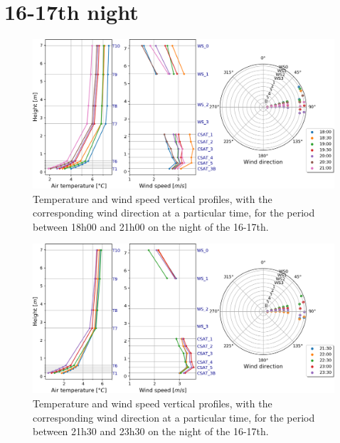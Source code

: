 \label{ch:appendix}
\section{16-17th night} 

\begin{figure}[!ht]
    \centering
    \includegraphics[width=1\textwidth]{fig/chapter_4/16-17/18-21_profiles.png}
    \caption{Temperature and wind speed vertical profiles, with the corresponding wind direction at a particular time, for the period between 18h00 and 21h00 on the night of the 16-17th.}
    \label{fig:16-17_18-21_profiles.png}
\end{figure}

\begin{figure}[!ht]
    \centering
    \includegraphics[width=1\textwidth]{fig/chapter_4/16-17/21-23_profiles.png}
    \caption{Temperature and wind speed vertical profiles, with the corresponding wind direction at a particular time, for the period between 21h30 and 23h30 on the night of the 16-17th.}
    \label{fig:16-17_21-23_profiles.png}
\end{figure}

